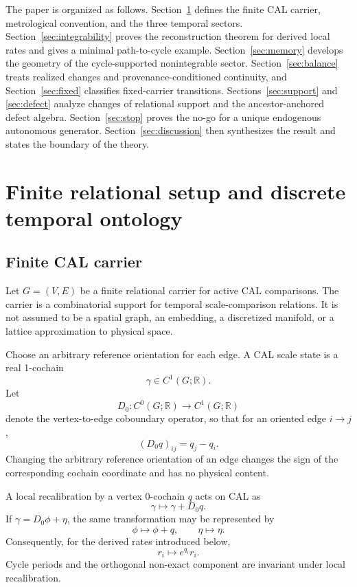\documentclass[aip,jmp,amsmath,amssymb,reprint]{revtex4-2}
\begin{document}
The paper is organized as follows. Section~\ref{sec:setup} defines the finite CAL carrier, metrological convention, and the three temporal sectors. Section~\ref{sec:integrability} proves the reconstruction theorem for derived local rates and gives a minimal path-to-cycle example. Section~\ref{sec:memory} develops the geometry of the cycle-supported nonintegrable sector. Section~\ref{sec:balance} treats realized changes and provenance-conditioned continuity, and Section~\ref{sec:fixed} classifies fixed-carrier transitions. Sections~\ref{sec:support} and \ref{sec:defect} analyze changes of relational support and the ancestor-anchored defect algebra. Section~\ref{sec:stop} proves the no-go for a unique endogenous autonomous generator. Section~\ref{sec:discussion} then synthesizes the result and states the boundary of the theory.

\section{Finite relational setup and discrete temporal ontology}\label{sec:setup}

\subsection{Finite CAL carrier}

Let $G=(V,E)$ be a finite relational carrier for active CAL comparisons. The carrier is a combinatorial support for temporal scale-comparison relations. It is not assumed to be a spatial graph, an embedding, a discretized manifold, or a lattice approximation to physical space.

Choose an arbitrary reference orientation for each edge. A CAL scale state is a real 1-cochain
\begin{equation}
\gamma\in C^1(G;\mathbb R).
\end{equation}
Let
\begin{equation}
D_0:C^0(G;\mathbb R)\longrightarrow C^1(G;\mathbb R)
\end{equation}
denote the vertex-to-edge coboundary operator, so that for an oriented edge $i\to j$,
\begin{equation}
(D_0 q)_{ij}=q_j-q_i.
\label{eq:coboundary}
\end{equation}
Changing the arbitrary reference orientation of an edge changes the sign of the corresponding cochain coordinate and has no physical content.

A local recalibration by a vertex 0-cochain $q$ acts on CAL as
\begin{equation}
\gamma\longmapsto\gamma+D_0q.
\label{eq:cal-gauge}
\end{equation}
If $\gamma=D_0\phi+\eta$, the same transformation may be represented by
\begin{equation}
\phi\longmapsto\phi+q,
\qquad
\eta\longmapsto\eta.
\label{eq:potential-gauge}
\end{equation}
Consequently, for the derived rates introduced below,
\begin{equation}
r_i\longmapsto e^{q_i}r_i.
\label{eq:rate-gauge}
\end{equation}
Cycle periods and the orthogonal non-exact component are invariant under local recalibration.
\end{document}
